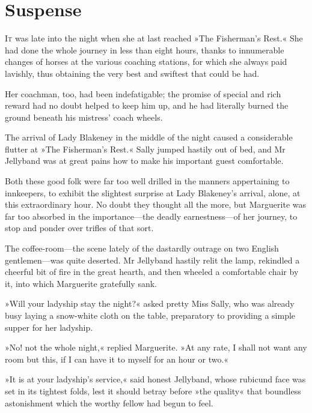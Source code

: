 
\chapter{Suspense}
\lettrine[lines=4]{I}{t} was late into the night when she at last reached »The Fisherman's Rest.« She had done the whole journey in less than eight hours, thanks to innumerable changes of horses at the various coaching stations, for which she always paid lavishly, thus obtaining the very best and swiftest that could be had.

Her coachman, too, had been indefatigable; the promise of special and rich reward had no doubt helped to keep him up, and he had literally burned the ground beneath his mistress' coach wheels.

The arrival of Lady Blakeney in the middle of the night caused a considerable flutter at »The Fisherman's Rest.« Sally jumped hastily out of bed, and Mr Jellyband was at great pains how to make his important guest comfortable.

Both these good folk were far too well drilled in the manners appertaining to innkeepers, to exhibit the slightest surprise at Lady Blakeney's arrival, alone, at this extraordinary hour. No doubt they thought all the more, but Marguerite was far too absorbed in the importance\allowbreak---\allowbreak the deadly earnestness\allowbreak---\allowbreak of her journey, to stop and ponder over trifles of that sort.

The coffee-room\allowbreak---\allowbreak the scene lately of the dastardly outrage on two English gentlemen\allowbreak---\allowbreak was quite deserted. Mr Jellyband hastily relit the lamp, rekindled a cheerful bit of fire in the great hearth, and then wheeled a comfortable chair by it, into which Marguerite gratefully sank.

»Will your ladyship stay the night?« asked pretty Miss Sally, who was already busy laying a snow-white cloth on the table, preparatory to providing a simple supper for her ladyship.

»No! not the whole night,« replied Marguerite. »At any rate, I shall not want any room but this, if I can have it to myself for an hour or two.«

»It is at your ladyship's service,« said honest Jellyband, whose rubicund face was set in its tightest folds, lest it should betray before »the quality« that boundless astonishment which the worthy fellow had begun to feel.

